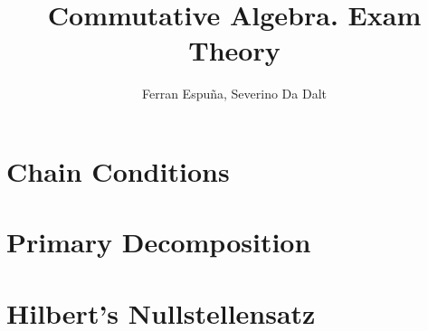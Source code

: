 \documentclass[11pt]{article}
\title{Commutative Algebra. Exam Theory}
\author{Ferran Espuña, Severino Da Dalt}
\theoremstyle{definition}
\begin{document}
    \maketitle

    \section{Chain Conditions}\label{sec:chain-conditions}
    

    \section{Primary Decomposition}\label{sec:primary-decomposition}
    

    \section{Hilbert's Nullstellensatz}\label{sec:hilbert-nullstellensatz}
    
\end{document}
